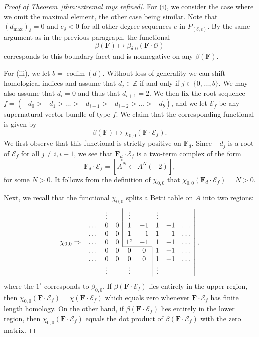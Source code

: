 \documentclass[12pt]{amsart}
\theoremstyle{definition}
\theoremstyle{remark}
\newcommand{\codim}{\operatorname{codim}}
\newcommand{\ZZ}{\mathbb{Z}}
\newcommand{\cO}{\mathcal{O}}
\newcommand{\cE}{\mathcal{E}}
\newcommand{\FF}{\mathbf{F}}
\begin{document}
\begin{proof}[Proof of Theorem~\ref{thm:extremal rays refined}]
For (i), we consider the case where we omit the maximal element, the other case being similar.  Note that $(d_{\max})_{\delta}=0$ and $e_{\delta}<0$ for all other degree sequences $e$ in $P_{(\delta,\epsilon)}$.  By the same argument as in the previous paragraph, the functional 
\[
\beta(\FF)\mapsto \beta_{\delta,0}(\FF\cdot \cO)
\]
corresponds to this boundary facet and is nonnegative on any $\beta(\FF)$.

For (iii), we let $b=\codim(d)$.  Without loss of generality we can shift homological indices and assume that $d_j\in \ZZ$ if and only if $j\in \{0, \dots, b\}$.   We may also assume that $d_i=0$ and thus that $d_{i+1}=2$.  We then fix the root sequence $f=(-d_0>-d_1>\dots >-d_{i-1}>-d_{i+2}>\dots >-d_{b})$, and we let $\cE_f$ be any supernatural vector bundle of type $f$.  We claim that the corresponding functional is given by
\begin{equation}\label{eqn:caseiii}
\beta(\FF) \mapsto \chi_{0,0}(\FF\cdot \cE_f).
\end{equation}
We first observe that this functional is strictly positive on $\FF_d$.  Since $-d_j$ is a root of $\cE_f$ for all $j\ne i,i+1$, we see that $\FF_d\cdot \cE_f$ is a two-term complex of the form
\[
\FF_d\cdot \cE_f=\left[ \overset{\circ}{A^N} \gets A^N(-2)\right],
\]
for some $N>0$.  It follows from the definition of $\chi_{0,0}$ that $\chi_{0,0}(\FF_d\cdot \cE_f)=N>0$.  

Next, we recall that the functional $\chi_{0,0}$ splits a Betti table on $A$ into two regions:
\[
\chi_{0,0}\Rightarrow 
\left|
\begin{array}{cccccccc}
 & \vdots& &\multicolumn{1}{|c}{\vdots}&& \vdots&&\\
\dots&0&0&\multicolumn{1}{|c}{1}&-1&1&-1&\dots\\
\dots&0&0&\multicolumn{1}{|c}{1}&-1&1&-1&\dots\\
\dots&0&0&\multicolumn{1}{|c}{1^\circ}&-1&1&-1&\dots\\ \cline{4-5}
\dots&0&0&0&0&\multicolumn{1}{|c}{1}&-1&\dots\\
\dots&0&0&0&0&\multicolumn{1}{|c}{1}&-1&\dots\\
& \vdots&&\vdots&& \multicolumn{1}{|c}{\vdots}&&\\
\end{array}
\right|,
\]
where the $1^\circ$ corresponds to $\beta_{0,0}$.   If $\beta(\FF\cdot \cE_f)$ lies entirely in the upper region, then $\chi_{0,0}(\FF\cdot \cE_f)=\chi(\FF\cdot \cE_f)$ which equals zero whenever $\FF\cdot \cE_f$ has finite length homology.  On the other hand, if $\beta(\FF\cdot \cE_f)$ lies entirely in the lower region, then $\chi_{0,0}(\FF\cdot \cE_f)$ equals the dot product of $\beta(\FF\cdot \cE_f)$ with the zero matrix.


\end{proof}
\end{document}
